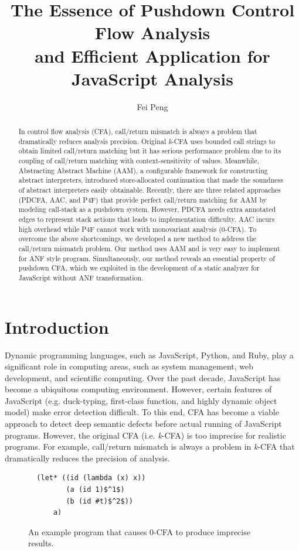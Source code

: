 \documentclass{article}
\title{The Essence of Pushdown Control Flow Analysis \\ and Efficient Application for JavaScript Analysis}
\author{Fei Peng}
\begin{document}
\maketitle
\begin{abstract}
In control flow analysis (CFA), call/return mismatch is always a problem that dramatically reduces analysis precision. Original \textit{k}-CFA uses bounded call strings to obtain limited call/return matching but it has serious performance problem
due to its coupling of call/return matching with context-sensitivity of values.
Meanwhile, Abstracting Abstract Machine (AAM), a configurable framework for constructing abstract interpreters,
introduced store-allocated continuation that made the soundness of abstract interpreters easily obtainable.
Recently, there are three related approaches (PDCFA, AAC, and P4F) that provide perfect call/return matching for AAM by modeling call-stack as a pushdown system.
However, PDCFA needs extra annotated edges to represent stack actions that leads to implementation difficulty.
AAC incurs high overhead while P4F cannot work with monovariant analysis (0-CFA).
To overcome the above shortcomings, we developed a new method to address the call/return mismatch problem.
Our method uses AAM and is very easy to implement for ANF style program.
Simultaneously, our method reveals an essential property of pushdown CFA,
which we exploited in the development of a static analyzer for JavaScript without ANF transformation.

\end{abstract}
\section{Introduction}
\label{Introduction}
Dynamic programming languages, such as JavaScript, Python, and Ruby, play a significant role in computing areas, such as system management, web development, and scientific computing.
Over the past decade, JavaScript has become a ubiquitous computing environment.
However, certain features of JavaScript (e.g. duck-typing, first-class function, and highly dynamic object model) make error detection difficult.
To this end, CFA has become a viable approach to detect deep semantic defects before actual running of JavaScript programs.
However, the original CFA (i.e. \textit{k}-CFA) is too imprecise for realistic programs.
For example, call/return mismatch is always a problem in \textit{k}-CFA that dramatically reduces the precision of analysis.

\begin{figure}
\begin{lstlisting}
  (let* ((id (lambda (x) x))
         (a (id 1)$^1$)
         (b (id #t)$^2$))
      a)
\end{lstlisting}
\caption{An example program that causes 0-CFA to produce imprecise results.}
\label{fig:eg1}
\end{figure}
\end{document}
